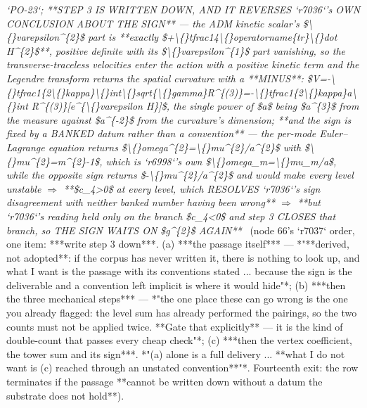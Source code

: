 \begin{description}
\textit{`PO-23`;  **STEP 3 IS WRITTEN DOWN, AND IT REVERSES `r7036`'s OWN CONCLUSION ABOUT THE SIGN** --- the ADM kinetic scalar's \$\textbackslash\{\}varepsilon\textasciicircum{}\{2\}\$ part is **exactly \$+\textbackslash\{\}tfrac14\textbackslash\{\}operatorname\{tr\}\textbackslash\{\}dot H\textasciicircum{}\{2\}\$**, positive definite with its \$\textbackslash\{\}varepsilon\textasciicircum{}\{1\}\$ part vanishing, so the transverse-traceless velocities enter the action with a positive kinetic term and the Legendre transform returns the spatial curvature with a **MINUS**: \$V=-\textbackslash\{\}tfrac1\{2\textbackslash\{\}kappa\}\textbackslash\{\}int\textbackslash\{\}sqrt\{\textbackslash\{\}gamma\}R\textasciicircum{}\{(3)\}=-\textbackslash\{\}tfrac1\{2\textbackslash\{\}kappa\}a\textbackslash\{\}int R\textasciicircum{}\{(3)\}[e\textasciicircum{}\{\textbackslash\{\}varepsilon H\}]\$, the single power of \$a\$ being \$a\textasciicircum{}\{3\}\$ from the measure against \$a\textasciicircum{}\{-2\}\$ from the curvature's dimension; **and the sign is fixed by a BANKED datum rather than a convention** --- the per-mode Euler--Lagrange equation returns \$\textbackslash\{\}omega\textasciicircum{}\{2\}=\textbackslash\{\}mu\textasciicircum{}\{2\}/a\textasciicircum{}\{2\}\$ with \$\textbackslash\{\}mu\textasciicircum{}\{2\}=m\textasciicircum{}\{2\}-1\$, which is `r6998`'s own \$\textbackslash\{\}omega\_m=\textbackslash\{\}mu\_m/a\$, while the opposite sign returns \$-\textbackslash\{\}mu\textasciicircum{}\{2\}/a\textasciicircum{}\{2\}\$ and would make every level unstable \ensuremath{\Rightarrow} **\$c\_4>0\$ at every level, which RESOLVES `r7036`'s sign disagreement with neither banked number having been wrong** \ensuremath{\Rightarrow}  **but `r7036`'s reading held only on the branch \$c\_4<0\$ and step 3 CLOSES that branch, so THE SIGN WAITS ON \$g\textasciicircum{}\{2\}\$ AGAIN**} \ (node 66's `r7037` order, one item: ***write step 3 down***. (a) ***the passage itself*** --- *"**derived, not adopted**: if the corpus has never written it, there is nothing to look up, and what I want is the passage with its conventions stated ... because the sign is the deliverable and a convention left implicit is where it would hide"*; (b) ***then the three mechanical steps*** --- *"the one place these can go wrong is the one you already flagged: the level sum has already performed the pairings, so the two counts must not be applied twice. **Gate that explicitly** --- it is the kind of double-count that passes every cheap check"*; (c) ***then the vertex coefficient, the tower sum and its sign***.  *"(a) alone is a full delivery ... **what I do not want is (c) reached through an unstated convention**"*.  Fourteenth exit: the row terminates if the passage **cannot be written down without a datum the substrate does not hold**). 

\end{description}
